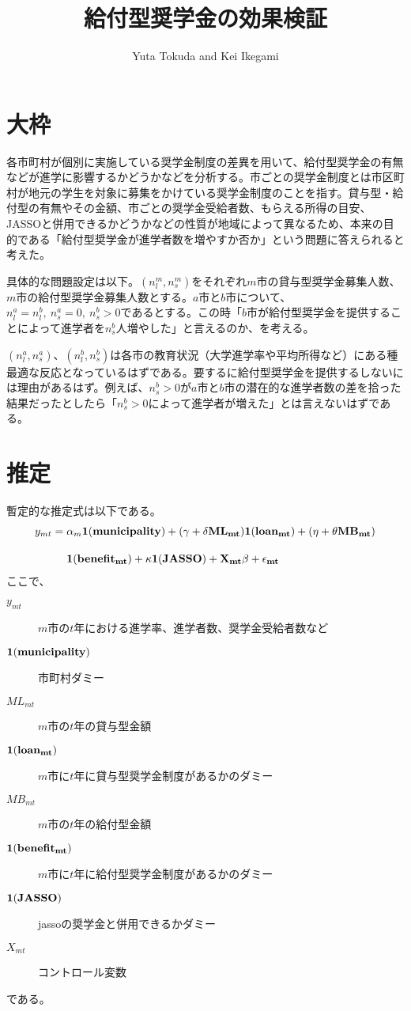 \documentclass{jsarticle}
\begin{document}
\title{給付型奨学金の効果検証}
\author{Yuta Tokuda and Kei Ikegami}
\maketitle

\section{大枠}
各市町村が個別に実施している奨学金制度の差異を用いて、給付型奨学金の有無などが進学に影響するかどうかなどを分析する。市ごとの奨学金制度とは市区町村が地元の学生を対象に募集をかけている奨学金制度のことを指す。貸与型・給付型の有無やその金額、市ごとの奨学金受給者数、もらえる所得の目安、JASSOと併用できるかどうかなどの性質が地域によって異なるため、本来の目的である「給付型奨学金が進学者数を増やすか否か」という問題に答えられると考えた。
\par
具体的な問題設定は以下。$(n_l^m, n_s^m)$をそれぞれ$m$市の貸与型奨学金募集人数、$m$市の給付型奨学金募集人数とする。$a$市と$b$市について、$n_l^a = n_l^b,\ n_s^a = 0,\ n_s^b > 0$であるとする。この時「$b$市が給付型奨学金を提供することによって進学者を$n_s^b$人増やした」と言えるのか、を考える。
\par
$(n_l^a, n_s^a)$、$(n_l^b, n_s^b)$は各市の教育状況（大学進学率や平均所得など）にある種最適な反応となっているはずである。要するに給付型奨学金を提供するしないには理由があるはず。例えば、$n_s^b > 0$が$a$市と$b$市の潜在的な進学者数の差を拾った結果だったとしたら「$n_s^b > 0$によって進学者が増えた」とは言えないはずである。

\section{推定}
暫定的な推定式は以下である。
\begin{align*}
y_{mt}&=\alpha_{m}\bf1 (municipality)+(\gamma+\delta ML_{mt})\bf1(loan_{mt})+(\eta+\theta MB_{mt})\\[10pt]& \quad\  \bf1(benefit_{mt})+\kappa\bf1(JASSO)+X_{mt}\beta+\epsilon_{mt}
\end{align*}
ここで、
	\begin{description}
	        \item[$y_{mt}$] $m$市の$t$年における進学率、進学者数、奨学金受給者数など
		\item[$\bf1 (municipality)$]  市町村ダミー
		\item[$ML_{mt}$]  $m$市の$t$年の貸与型金額
		\item[$\bf1(loan_{mt})$]  $m$市に$t$年に貸与型奨学金制度があるかのダミー
		\item[$MB_{mt}$]  $m$市の$t$年の給付型金額
		\item[$\bf1(benefit_{mt})$]  $m$市に$t$年に給付型奨学金制度があるかのダミー
		\item[$\bf1(JASSO)$]  jassoの奨学金と併用できるかダミー
	　　 \item[$X_{mt}$]  コントロール変数
	\end{description}
	である。
\end{document}
